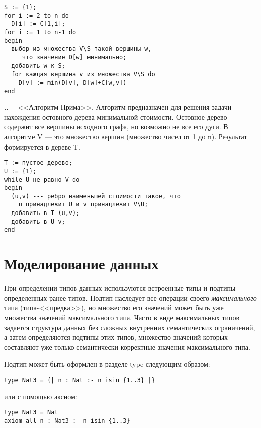 \documentclass[14pt, twoside]{extreport}
\newcounter{problem_type}[chapter]
\newcounter{zadacha}[problem_type]
\newcommand{\z}{\vspace{0.5cm}\par\addtocounter{zadacha}{1}%
\textit{\arabic{chapter}.\arabic{problem_type}.\arabic{zadacha}}~~  }
\begin{document}
\begin{verbatim}
S := {1};
for i := 2 to n do
  D[i] := C[1,i];
for i := 1 to n-1 do
begin
  выбор из множества V\S такой вершины w,
     что значение D[w] минимально;
  добавить w к S;
  for каждая вершина v из множества V\S do
    D[v] := min(D[v], D[w]+C[w,v])
end
\end{verbatim}


\z <<Алгоритм Прима>>. Алгоритм предназначен для решения задачи нахождения остовного дерева минимальной стоимости. Остовное дерево содержит все вершины исходного графа, но возможно не все его дуги. В алгоритме V --- это множество вершин (множество чисел от 1 до n). Результат формируется в дереве T.

\begin{verbatim}
T := пустое дерево;
U := {1};
while U не равно V do
begin
  (u,v) --- ребро наименьшей стоимости такое, что
    u принадлежит U и v принадлежит V\U;
  добавить в T (u,v);
  добавить в U v;
end
\end{verbatim}






\section{Моделирование данных}

При определении типов данных используются встроенные типы и подтипы определенных ранее типов. Подтип наследует все операции своего \emph{максимального} типа (типа-<<предка>>), но множество его значений может быть уже множества значений максимального типа. Часто в виде максимальных типов задается структура данных без сложных внутренних семантических ограничений, а затем определяются подтипы этих типов, множество значений которых составляют уже только семантически корректные значения максимального типа.

Подтип может быть оформлен в разделе type следующим образом:
\begin{lstlisting}
type Nat3 = {| n : Nat :- n isin {1..3} |}
\end{lstlisting}

или с помощью аксиом:
\begin{lstlisting}
type Nat3 = Nat
axiom all n : Nat3 :- n isin {1..3}
\end{lstlisting}
\end{document}
